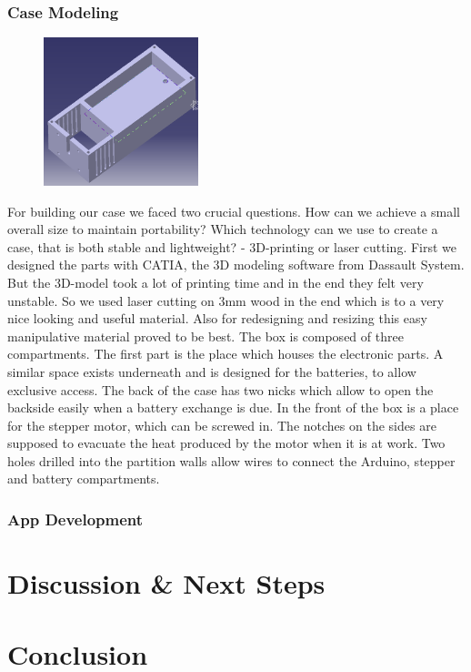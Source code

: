 \documentclass{sigchi}
\begin{document}
 
\subsubsection{Case Modeling}
\begin{figure}
	\center
	\includegraphics[width=0.4\textwidth]{case.png}
\end{figure} 
For building our case we faced two crucial questions. How can we achieve a small overall size to maintain portability? Which technology can we use to create a case, that is both stable and lightweight? - 3D-printing or laser cutting. First we designed the parts with CATIA, the 3D modeling software from Dassault System. But the 3D-model took a lot of printing time and in the end they felt very unstable. So we used laser cutting on 3mm wood in the end which is to a very nice looking and useful material. Also for redesigning and resizing this easy manipulative material proved to be best.
The box is composed of three compartments. The first part is the place which houses the electronic parts. A similar space exists underneath and is designed for the batteries, to allow exclusive access. The back of the case has two nicks which allow to open the backside easily when a battery exchange is due. In the front of the box is a place for the stepper motor, which can be screwed in. The notches on the sides are supposed to evacuate the heat produced by the motor when it is at work. Two holes drilled into the partition walls allow wires to connect the Arduino, stepper and battery compartments.



\subsubsection{App Development}

\section{Discussion \& Next Steps}

\section{Conclusion}



\end{document}
